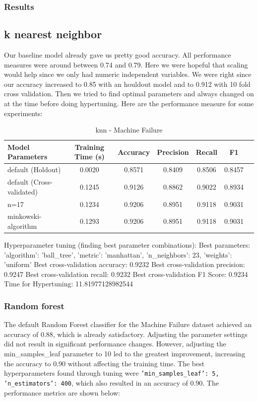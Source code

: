 \documentclass{article}
\begin{document}
\subsubsection{Results}
\subsection*{k nearest neighbor}
Our baseline model already gave us pretty good accuracy. All performance measures were around between 0.74 and 0.79. Here we were hopeful that scaling would help since we only had numeric independent variables. We were right since our accuracy increased to 0.85 with an houldout model and to 0.912 with 10 fold cross validation. Then we tried to find optimal parameters and always changed on at the time before doing hypertuning. Here are the performance measure for some experiments:

\begin{table}[H]
\centering
\begin{tabular}{l|c|c|c|c|c|c}
\textbf{Model Parameters} & \textbf{Training Time (s)} & \textbf{Accuracy} & \textbf{Precision} & \textbf{Recall} & \textbf{F1} \\\hline
default (Holdout) & 0.0020 & 0.8571 & 0.8409 & 0.8506 & 0.8457 \\
default (Cross-validated) & 0.1245  & 0.9126 & 0.8862 &0.9022 & 0.8934\\
n=17 & 0.1234  & 0.9206 & 0.8951 & 0.9118 & 0.9031 \\
minkowski-algorithm & 0.1293  & 0.9206 & 0.8951 & 0.9118 & 0.9031 \\
\end{tabular}
\caption{knn - Machine Failure}
\label{tab:knn - Machine Failure}
\end{table}

Hyperparameter tuning (finding best parameter combinations):
Best parameters: {'algorithm': 'ball_tree', 'metric': 'manhattan', 'n_neighbors': 23, 'weights': 'uniform'}
Best cross-validation accuracy: 0.9232
Best cross-validation precision: 0.9247
Best cross-validation recall: 0.9232
Best cross-validation F1 Score: 0.9234
Time for Hypertuning:  11.81977128982544

\subsubsection*{Random forest}
The default Random Forest classifier for the Machine Failure dataset achieved an accuracy of 0.88, which is already satisfactory. Adjusting the parameter settings did not result in significant performance changes. However, adjusting the min\_samples\_leaf parameter to 10 led to the greatest improvement, increasing the accuracy to 0.90 without affecting the training time. The best hyperparameters found through tuning were \texttt{{'min\_samples\_leaf': 5, 'n\_estimators': 400}}, which also resulted in an accuracy of 0.90. The performance metrics are shown below:
\end{document}
